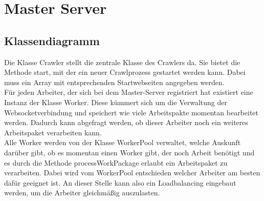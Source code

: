 \section{Master Server}
\subsection{Klassendiagramm}
Die Klasse Crawler stellt die zentrale Klasse des Crawlers da. Sie bietet die Methode start, mit der ein neuer Crawlprozess gestartet werden kann. Dabei muss ein Array mit entsprechenden Startwebseiten angegeben werden. \\
Für jeden Arbeiter, der sich bei dem Master-Server registriert hat existiert eine Instanz der Klasse Worker. Diese kümmert sich um die Verwaltung der Websocketverbindung und speichert wie viele Arbeitspakte momentan bearbeitet werden. Dadurch kann abgefragt werden, ob dieser Arbeiter noch ein weiteres Arbeitspaket verarbeiten kann. \\
Alle Worker werden von der Klasse WorkerPool verwaltet, welche Auskunft darüber gibt, ob es momentan einen Worker gibt, der noch Arbeit benötigt und es durch die Methode processWorkPackage erlaubt ein Arbeitspaket zu verarbeiten. Dabei wird vom WorkerPool entschieden welcher Arbeiter am besten dafür geeignet ist. An dieser Stelle kann also ein Loadbalancing eingebaut werden, um die Arbeiter gleichmäßig auszulasten.

